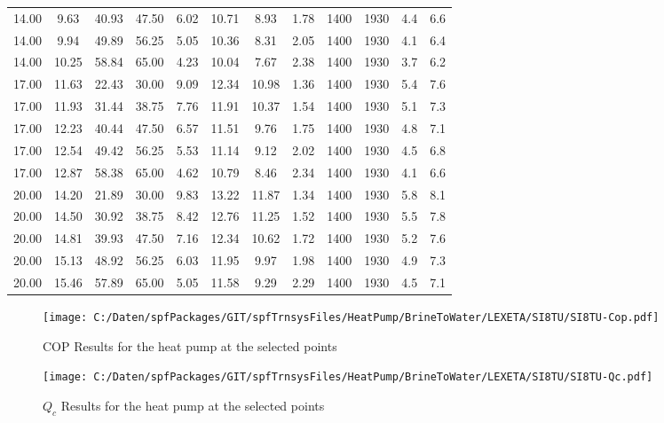 \documentclass[english]{SPFShortReport}
\begin{document}
\begin{table}[!ht]
\begin{small}
\begin{center}
{\begin{tabular}{l | c c c c c c c c c c c }
14.00 & 9.63 & 40.93 & 47.50 & 6.02 & 10.71 & 8.93 & 1.78 & 1400 & 1930 & 4.4 & 6.6\\ 
14.00 & 9.94 & 49.89 & 56.25 & 5.05 & 10.36 & 8.31 & 2.05 & 1400 & 1930 & 4.1 & 6.4\\ 
14.00 & 10.25 & 58.84 & 65.00 & 4.23 & 10.04 & 7.67 & 2.38 & 1400 & 1930 & 3.7 & 6.2\\ 
17.00 & 11.63 & 22.43 & 30.00 & 9.09 & 12.34 & 10.98 & 1.36 & 1400 & 1930 & 5.4 & 7.6\\ 
17.00 & 11.93 & 31.44 & 38.75 & 7.76 & 11.91 & 10.37 & 1.54 & 1400 & 1930 & 5.1 & 7.3\\ 
17.00 & 12.23 & 40.44 & 47.50 & 6.57 & 11.51 & 9.76 & 1.75 & 1400 & 1930 & 4.8 & 7.1\\ 
17.00 & 12.54 & 49.42 & 56.25 & 5.53 & 11.14 & 9.12 & 2.02 & 1400 & 1930 & 4.5 & 6.8\\ 
17.00 & 12.87 & 58.38 & 65.00 & 4.62 & 10.79 & 8.46 & 2.34 & 1400 & 1930 & 4.1 & 6.6\\ 
20.00 & 14.20 & 21.89 & 30.00 & 9.83 & 13.22 & 11.87 & 1.34 & 1400 & 1930 & 5.8 & 8.1\\ 
20.00 & 14.50 & 30.92 & 38.75 & 8.42 & 12.76 & 11.25 & 1.52 & 1400 & 1930 & 5.5 & 7.8\\ 
20.00 & 14.81 & 39.93 & 47.50 & 7.16 & 12.34 & 10.62 & 1.72 & 1400 & 1930 & 5.2 & 7.6\\ 
20.00 & 15.13 & 48.92 & 56.25 & 6.03 & 11.95 & 9.97 & 1.98 & 1400 & 1930 & 4.9 & 7.3\\ 
20.00 & 15.46 & 57.89 & 65.00 & 5.05 & 11.58 & 9.29 & 2.29 & 1400 & 1930 & 4.5 & 7.1\\ 
\hline
\hline
\end{tabular}
}
\label{ResultsTable}
\end{center}
\end{small}
\end{table}
\begin{figure}[!ht]
\begin{center}
\texttt{[image: C:/Daten/spfPackages/GIT/spfTrnsysFiles/HeatPump/BrineToWater/LEXETA/SI8TU/SI8TU-Cop.pdf]}
\caption{COP Results for the heat pump at the selected points}
\label{COPFig}
\end{center}
\end{figure}
\begin{figure}[!ht]
\begin{center}
\texttt{[image: C:/Daten/spfPackages/GIT/spfTrnsysFiles/HeatPump/BrineToWater/LEXETA/SI8TU/SI8TU-Qc.pdf]}
\caption{$Q_c$ Results for the heat pump at the selected points}
\label{QcFig}
\end{center}
\end{figure}
\end{document}
